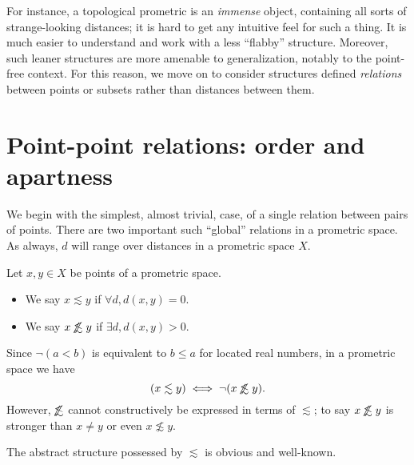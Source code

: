 \documentclass{article}
\def\oapt{\mathrel{\!\not\,\not\lesssim}}
\def\leapx{\lesssim}
\begin{document}
For instance, a topological prometric is an \emph{immense} object, containing all sorts of strange-looking distances; it is hard to get any intuitive feel for such a thing.
It is much easier to understand and work with a less ``flabby'' structure.
Moreover, such leaner structures are more amenable to generalization, notably to the point-free context.
For this reason, we move on to consider structures defined \emph{relations} between points or subsets rather than distances between them.


\section{Point-point relations: order and apartness}
\label{sec:point-point}
\label{sec:order}

We begin with the simplest, almost trivial, case, of a single relation between pairs of points.
There are two important such ``global'' relations in a prometric space.
As always, $d$ will range over distances in a prometric space $X$.

\begin{defn}\label{def:promet-ord}
  Let $x,y\in X$ be points of a prometric space.
  \begin{itemize}
  \item We say $x\leapx y$ if $\forall d, d(x,y)=0$.
  \item We say $x\oapt y$ if $\exists d, d(x,y)>0$.
  \end{itemize}
\end{defn}

Since $\neg(a<b)$ is equivalent to $b\le a$ for located real numbers, in a prometric space we have
\begin{equation}
  (x\leapx y) \iff \neg(x\oapt y).\label{eq:leapx-oapt}
\end{equation}
However, $\oapt$ cannot constructively be expressed in terms of $\leapx$; to say $x\oapt y$ is stronger than $x\neq y$ or even $x\not\leapx y$.

The abstract structure possessed by $\leapx$ is obvious and well-known.
\end{document}
